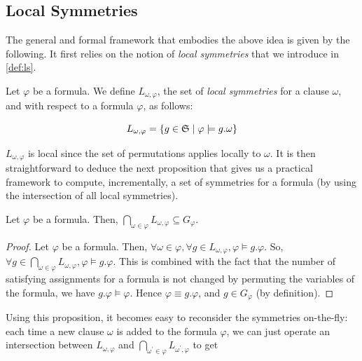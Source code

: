 
\subsection{Local Symmetries}
The general and formal framework that embodies the above idea is given by the following. It first relies on the notion of \textit{local symmetries} that we introduce in \cref{def:ls}.
\begin{definition}
 \label{def:ls}
 Let $\varphi$ be a formula. We define $L_{\omega,\varphi}$, 
 the set of \textit{local symmetries} for a clause $\omega$, and with respect to 
 a formula $\varphi$, as follows:
 
 $$L_{\omega,\varphi}=\{g \in \mathfrak{S} \mid \varphi \models g.\omega\}$$
\end{definition}
$L_{\omega,\varphi}$ is local since the set of permutations applies locally to
$\omega$. It is then straightforward to deduce the next proposition that gives us a
practical framework to compute, incrementally, a set of symmetries for a
formula (by using the intersection of all local symmetries).
\begin{proposition}
 \label{prop:gls-prop}
 Let $\varphi$ be a formula. Then,  $\underset{\omega \in \varphi}{\bigcap}L_{\omega,\varphi} 
 \subseteq G_{\varphi}$.
\end{proposition}
\begin{proof}
 Let $\varphi$ be a formula. Then, $\forall \omega \in \varphi, \forall g \in L_{\omega,\varphi}, \varphi \models g.\varphi $. So, $\forall g \in \underset{\omega \in \varphi}{\bigcap}L_{\omega,\varphi}, \varphi \models g.\varphi$. This is combined with the fact that the number of satisfying assignments for a formula is not changed by permuting the variables of the formula, we have $g.\varphi \models \varphi$. Hence $\varphi \equiv g.\varphi$, and $g \in G_{\varphi}$ (by definition). 
\end{proof}
Using this proposition, it becomes easy to reconsider the symmetries
on-the-fly: each time a new clause $\omega$ is added to the formula $\varphi$,
we can just operate an intersection between $L_{\omega,\varphi}$ and
$\underset{\omega^\prime \in \varphi}{\bigcap}L_{\omega^\prime,\varphi}$ to get
